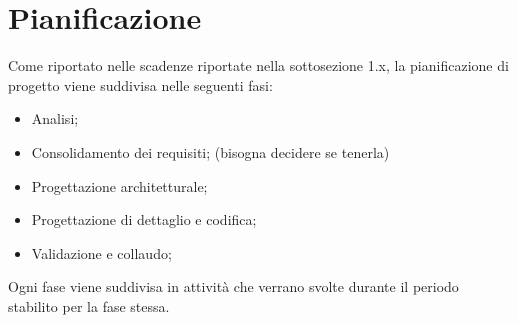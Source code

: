 \section{Pianificazione}
Come riportato nelle scadenze riportate nella sottosezione 1.x, la pianificazione di progetto viene suddivisa nelle seguenti fasi:
\begin{itemize}
	\item Analisi;
	\item Consolidamento dei requisiti; (bisogna decidere se tenerla)
	\item Progettazione architetturale;
	\item Progettazione di dettaglio e codifica;
	\item Validazione e collaudo;
\end{itemize}
Ogni fase viene suddivisa in attività che verrano svolte durante il periodo stabilito per la fase stessa.



